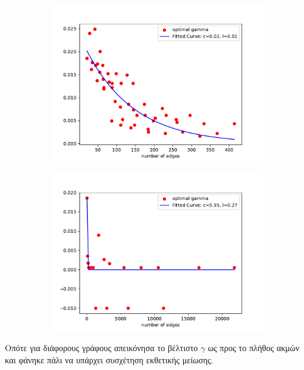 \documentclass[10pt, letterpaper]{article}
\begin{document}
\begin{figure}
  \centering
  \begin{subfigure}{0.48\textwidth}
    \centering
    \includegraphics[width=\linewidth]{EDGES_GAMMA_FIT.pdf}
    \caption{}
    \label{EDGESFIT}
  \end{subfigure}
  \begin{subfigure}{0.48\textwidth}
    \centering
    \includegraphics[width=\linewidth]{EDGES_GAMMA_FIT_noise.pdf}
    \caption{}
    \label{EDGESFIT_noise}
  \end{subfigure}
  \caption{}
\end{figure}

Οπότε για διάφορους γράφους απεικόνησα το βέλτιστο $\gamma$ ως προς το πλήθος ακμών και 
φάνηκε πάλι να υπάρχει συσχέτηση εκθετικής μείωσης. 
\end{document}
